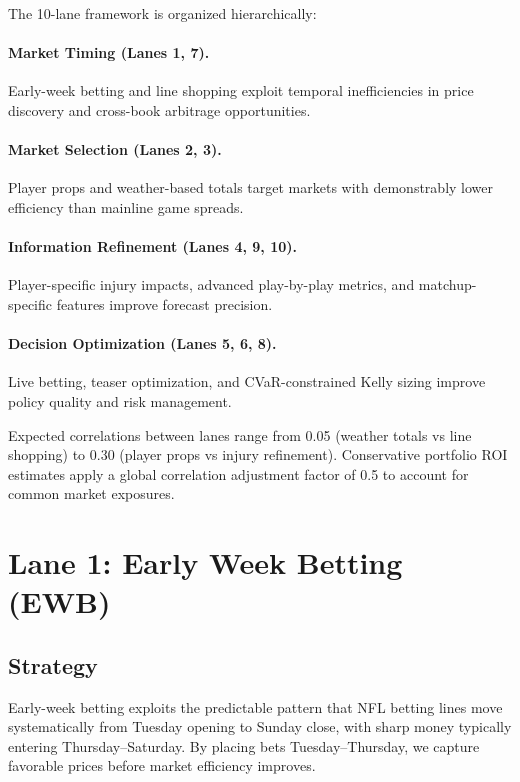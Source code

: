 The 10-lane framework is organized hierarchically:

\paragraph{Market Timing (Lanes 1, 7).}
Early-week betting and line shopping exploit temporal inefficiencies in price discovery and cross-book arbitrage opportunities.

\paragraph{Market Selection (Lanes 2, 3).}
Player props and weather-based totals target markets with demonstrably lower efficiency than mainline game spreads.

\paragraph{Information Refinement (Lanes 4, 9, 10).}
Player-specific injury impacts, advanced play-by-play metrics, and matchup-specific features improve forecast precision.

\paragraph{Decision Optimization (Lanes 5, 6, 8).}
Live betting, teaser optimization, and CVaR-constrained Kelly sizing improve policy quality and risk management.

Expected correlations between lanes range from 0.05 (weather totals vs line shopping) to 0.30 (player props vs injury refinement). Conservative portfolio ROI estimates apply a global correlation adjustment factor of 0.5 to account for common market exposures.

\section{Lane 1: Early Week Betting (EWB)}

\subsection{Strategy}

Early-week betting exploits the predictable pattern that NFL betting lines move systematically from Tuesday opening to Sunday close, with sharp money typically entering Thursday--Saturday. By placing bets Tuesday--Thursday, we capture favorable prices before market efficiency improves.

